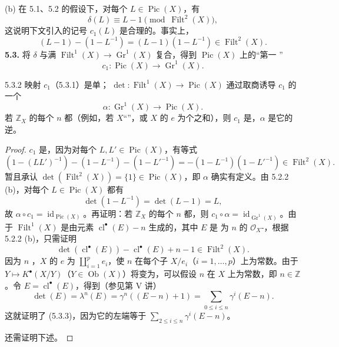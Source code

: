 (b) 在 5.1、5.2 的假设下，对每个 $L\in\operatorname{Pic}(X)$，有
\[\delta(L)\equiv L-1\pmod{\operatorname{Filt}^2(X)},\tag{5.2.4}\]
这说明下文引入的记号 $c_1(L)$ 是合理的。事实上，
\[(L-1)-(1-L^{-1})=(L-1)(1-L^{-1})\in\operatorname{Filt}^2(X).\]
\textbf{5.3.} 将 $\delta$ 与满 $\operatorname{Filt}^1(X)\longrightarrow\operatorname{Gr}^1(X)$ 复合，得到 $\operatorname{Pic}(X)$ 上的“第一 ”
\[c_1:\operatorname{Pic}(X)\longrightarrow\operatorname{Gr}^1(X).\tag{5.3.1}\]
\begin{SGAresult}{}{5.3.2}
映射 $c_1$（5.3.1）是单； $\det:\operatorname{Filt}^1(X)\longrightarrow\operatorname{Pic}(X)$ 通过取商诱导 $c_1$ 的一个
\[\alpha:\operatorname{Gr}^1(X)\longrightarrow\operatorname{Pic}(X).\]
若 $\mathbb Z_X$ 的每个 $n$ 都（例如，若 $X$“”，或 $X$ 的 $e$ 为个之和），则 $c_1$ 是，$\alpha$ 是它的逆。
\end{SGAresult}
\begin{proof}
$c_1$ 是，因为对每个 $L,L'\in\operatorname{Pic}(X)$，有等式
\[(1-(LL')^{-1})-(1-L^{-1})-(1-L'^{-1})=-(1-L^{-1})(1-L'^{-1})\in\operatorname{Filt}^2(X).\]
暂且承认 $\det(\operatorname{Filt}^2(X))=\{1\}\in\operatorname{Pic}(X)$，即 $\alpha$ 确实有定义。由 5.2.2 (b)，对每个 $L\in\operatorname{Pic}(X)$ 都有
\[\det(1-L^{-1})=\det(L-1)=L,\]
故 $\alpha\circ c_1=\operatorname{id}_{\operatorname{Pic}(X)}$。再证明：若 $\mathbb Z_X$ 的每个 $n$ 都，则 $c_1\circ\alpha=\operatorname{id}_{\operatorname{Gr}^1(X)}$。由于 $\operatorname{Filt}^1(X)$ 是由元素 $\operatorname{cl}^\bullet(E)-n$ 生成的，其中 $E$ 是
为 $n$ 的 $\mathcal O_X$-，根据 5.2.2 (b)，只需证明
\[\det(\operatorname{cl}^\bullet(E))-\operatorname{cl}^\bullet(E)+n-1\in\operatorname{Filt}^2(X).\tag{5.3.3}\]
因为 $n$ ，$X$ 的 $e$ 为 $\coprod_{i=1}^p e_i$，使 $n$ 在每个子 $X/e_i$（$i=1,\ldots,p$）上为常数。由于 $Y\longmapsto K^\bullet(X/Y)$（$Y\in\operatorname{Ob}(X)$）将变为，可以假设 $n$ 在 $X$ 上为常数，即 $n\in\mathbb Z$。令 $E=\operatorname{cl}^\bullet(E)$，得到（参见第 V 讲）
\[\det(E)=\lambda^n(E)=\gamma^n((E-n)+1)=\sum_{0\leq i\leq n}\gamma^i(E-n).\]
这就证明了 (5.3.3)，因为它的左端等于 $\sum_{2\leq i\leq n}\gamma^i(E-n)$。

还需证明下述。
\end{proof}
